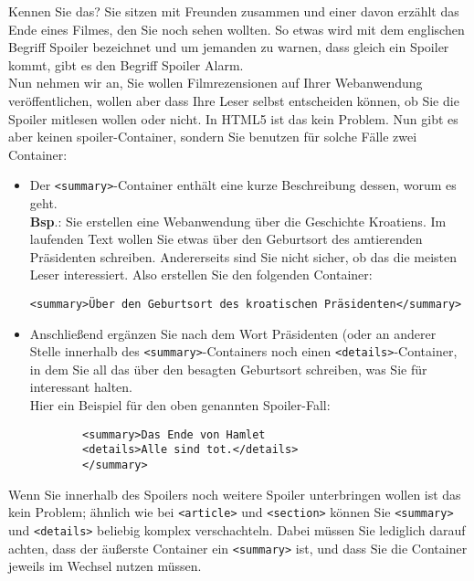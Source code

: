 Kennen Sie das? Sie sitzen mit Freunden zusammen und einer davon erzählt das Ende eines Filmes, den Sie noch sehen wollten. So etwas wird mit dem englischen Begriff Spoiler bezeichnet und um jemanden zu warnen, dass gleich ein Spoiler kommt, gibt es den Begriff Spoiler Alarm.\\

Nun nehmen wir an, Sie wollen Filmrezensionen auf Ihrer Webanwendung veröffentlichen, wollen aber dass Ihre Leser selbst entscheiden können, ob Sie die Spoiler mitlesen wollen oder nicht. In HTML5 ist das kein Problem. Nun gibt es aber keinen spoiler-Container, sondern Sie benutzen für solche Fälle zwei Container:

\begin{itemize}
	\item Der \verb|<summary>|-Container enthält eine kurze Beschreibung dessen, worum es geht. \\
	
	\textbf{Bsp}.: Sie erstellen eine Webanwendung über die Geschichte Kroatiens. Im laufenden Text wollen Sie etwas über den Geburtsort des amtierenden Präsidenten schreiben. Andererseits sind Sie nicht sicher, ob das die meisten Leser interessiert. Also erstellen Sie den folgenden Container:
	
	\verb|<summary>Über den Geburtsort des kroatischen Präsidenten</summary>|
	
	\item Anschließend ergänzen Sie nach dem Wort Präsidenten (oder an anderer Stelle innerhalb des \verb|<summary>|-Containers noch einen \verb|<details>|-Container, in dem Sie all das über den besagten Geburtsort schreiben, was Sie für interessant halten.\\
	
	Hier ein Beispiel für den oben genannten Spoiler-Fall:\\
	
	\begin{verbatim}
		<summary>Das Ende von Hamlet
		<details>Alle sind tot.</details>
		</summary>
	\end{verbatim}
	
\end{itemize}

Wenn Sie innerhalb des \glqq{}Spoilers\grqq{} noch weitere Spoiler unterbringen wollen ist das kein Problem; ähnlich wie bei \verb|<article>| und \verb|<section>| können Sie \verb|<summary>| und \verb|<details>| beliebig komplex verschachteln. Dabei müssen Sie lediglich darauf achten, dass der äußerste Container ein \verb|<summary>| ist, und dass Sie die Container jeweils im Wechsel nutzen müssen.\\

